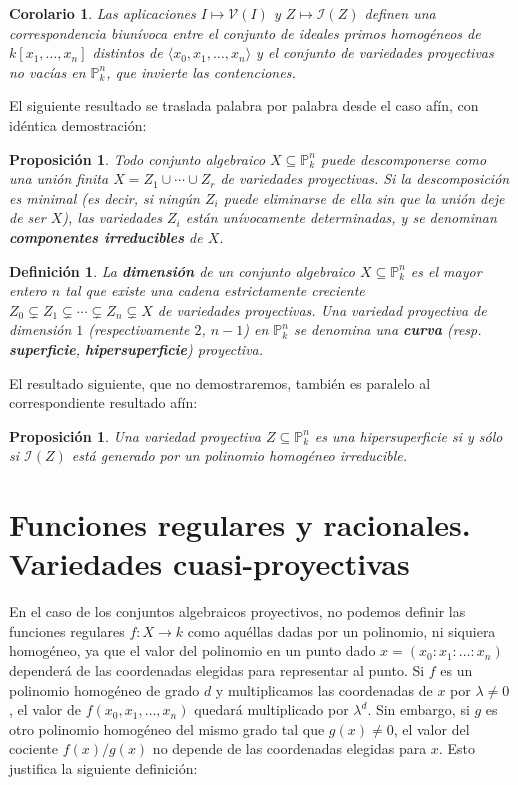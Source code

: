 \documentclass[a4paper,10pt]{book}
\newtheorem{cor}[thm]{Corolario}
\newtheorem{prop}[thm]{Proposición}
\newtheorem{defn}[thm]{Definición}
\newcommand{\PP}{\mathbb P}
\newcommand{\Pnk}{\PP^n_k}
\newcommand{\II}{{\mathcal I}}
\newcommand{\VV}{{\mathcal V}}
\begin{document}
\begin{cor}
 Las aplicaciones $I\mapsto\VV(I)$ y $Z\mapsto\II(Z)$ definen una correspondencia biunívoca entre el conjunto de ideales primos homogéneos de $k[x_1,\ldots,x_n]$ distintos de $\langle x_0,x_1,\ldots,x_n\rangle$ y el conjunto de variedades proyectivas no vacías en $\Pnk$, que invierte las contenciones.
\end{cor}

El siguiente resultado se traslada palabra por palabra desde el caso afín, con idéntica demostración:

\begin{prop}
 Todo conjunto algebraico $X\subseteq \Pnk$ puede descomponerse como una unión finita $X=Z_1\cup\cdots\cup Z_r$ de variedades proyectivas. Si la descomposición es minimal (es decir, si ningún $Z_i$ puede eliminarse de ella sin que la unión deje de ser $X$), las variedades $Z_i$ están unívocamente determinadas, y se denominan {\bf componentes irreducibles} de $X$.
\end{prop}

\begin{defn} La {\bf dimensión} de un conjunto algebraico $X\subseteq\Pnk$ es el mayor entero $n$ tal que existe una cadena estrictamente creciente $Z_0\subsetneq Z_1\subsetneq\cdots\subsetneq Z_n\subsetneq X$ de variedades proyectivas. Una variedad proyectiva de dimensión $1$ (respectivamente $2$, $n-1$) en $\Pnk$ se denomina una {\bf curva} (resp. {\bf superficie}, {\bf hipersuperficie}) proyectiva.
\end{defn}

El resultado siguiente, que no demostraremos, también es paralelo al correspondiente resultado afín:

\begin{prop}\label{principalproy}
 Una variedad proyectiva $Z\subseteq\Pnk$ es una hipersuperficie si y sólo si $\II(Z)$ está generado por un polinomio homogéneo irreducible. 
\end{prop}


\section{Funciones regulares y racionales. Variedades cuasi-proyectivas}

En el caso de los conjuntos algebraicos proyectivos, no podemos definir las funciones regulares $f:X\to k$ como aquéllas dadas por un polinomio, ni siquiera homogéneo, ya que el valor del polinomio en un punto dado $x=(x_0:x_1:\ldots:x_n)$ dependerá de las coordenadas elegidas para representar al punto. Si $f$ es un polinomio homogéneo de grado $d$ y multiplicamos las coordenadas de $x$ por $\lambda\neq 0$, el valor de $f(x_0,x_1,\ldots,x_n)$ quedará multiplicado por $\lambda^ d$. Sin embargo, si $g$ es otro polinomio homogéneo del mismo grado tal que $g(x)\neq 0$, el valor del cociente $f(x)/g(x)$ no depende de las coordenadas elegidas para $x$. Esto justifica la siguiente definición:
\end{document}
